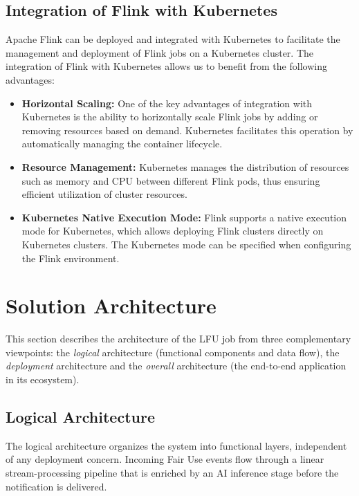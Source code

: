 \subsection{Integration of Flink with Kubernetes}
Apache Flink can be deployed and integrated with Kubernetes to facilitate the management and deployment of Flink jobs on a Kubernetes cluster.
The integration of Flink with Kubernetes allows us to benefit from the following advantages:

\begin{itemize}
    \item[-] \textbf{Horizontal Scaling:} One of the key advantages of integration with Kubernetes is the ability to horizontally scale Flink jobs by adding or removing resources based on demand. Kubernetes facilitates this operation by automatically managing the container lifecycle.
    \item[-] \textbf{Resource Management:} Kubernetes manages the distribution of resources such as memory and CPU between different Flink pods, thus ensuring efficient utilization of cluster resources.
    \item[-] \textbf{Kubernetes Native Execution Mode:} Flink supports a native execution mode for Kubernetes, which allows deploying Flink clusters directly on Kubernetes clusters. The Kubernetes mode can be specified when configuring the Flink environment.
\end{itemize}


\section{Solution Architecture}
\label{sec:architecture}

This section describes the architecture of the LFU job from three
complementary viewpoints: the \emph{logical} architecture (functional
components and data flow), the \emph{deployment} architecture and the \emph{overall} architecture
(the end-to-end application in its ecosystem).

\subsection{Logical Architecture}
\label{sec:archi-logical}

The logical architecture organizes the system into functional layers,
independent of any deployment concern. Incoming Fair Use events flow
through a linear stream-processing pipeline that is enriched by an AI
inference stage before the notification is delivered.

